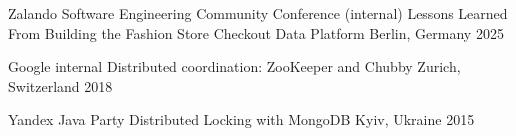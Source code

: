 

\begin{cventries}

  \cventry
    {Zalando Software Engineering Community Conference (internal)} %
    {Lessons Learned From Building the Fashion Store Checkout Data Platform} %
    {Berlin, Germany} %
    {2025} %
    {}

  \cventry
    {Google internal} %
    {Distributed coordination: ZooKeeper and Chubby} %
    {Zurich, Switzerland} %
    {2018} %
    {}

  \cventry
    {Yandex Java Party} %
    {Distributed Locking with MongoDB} %
    {Kyiv, Ukraine} %
    {2015} %
    {}

\end{cventries}
